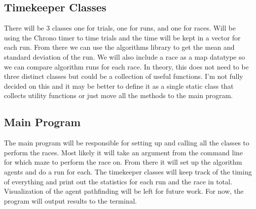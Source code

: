 \documentclass[letterpaper,12pt]{article}  %
\begin{document}
\subsection{Timekeeper Classes}
There will be 3 classes one for trials, one for runs, and one for races. Will 
be using the Chrono timer to time trials and the time will be kept in a vector 
for each run. From there we can use the algorithms library to get the mean and 
standard deviation of the run. We will also include a race as a map datatype so 
we can compare algorithm runs for each race. In theory, this does not need to 
be three distinct classes but could be a collection of useful functions. I’m 
not fully decided on this and it may be better to define it as a single static 
class that collects utility functions or just move all the methods to the main 
program.

\subsection{Main Program}
The main program will be responsible for setting up and calling all the classes 
to perform the races. Most likely it will take an argument from the command 
line for which maze to perform the race on. From there it will set up the 
algorithm agents and do a run for each. The timekeeper classes will keep track 
of the timing of everything and print out the statistics for each run and the 
race in total. Visualization of the agent pathfinding will be left for future 
work. For now, the program will output results to the terminal.
  


  

\newpage
\appendix  %





\end{document}
